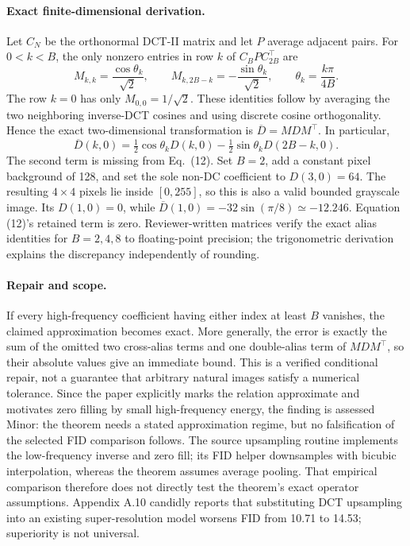 \documentclass[10pt]{article}
\begin{document}
\paragraph*{Exact finite-dimensional derivation.}\mbox{}\par
Let \(C_N\) be the orthonormal DCT-II matrix and let \(P\) average adjacent pairs. For \(0<k<B\), the only nonzero entries in row \(k\) of \(C_BP C_{2B}^{\top}\) are \[M_{k,k}=\frac{\cos\theta_k}{\sqrt2},\qquad
 M_{k,2B-k}=-\frac{\sin\theta_k}{\sqrt2},\qquad \theta_k=\frac{k\pi}{4B}.\] The row \(k=0\) has only \(M_{0,0}=1/\sqrt2\). These identities follow by averaging the two neighboring inverse-DCT cosines and using discrete cosine orthogonality. Hence the exact two-dimensional transformation is \(\overline D=MDM^{\top}\). In particular, \[\overline D(k,0)=\tfrac12\cos\theta_kD(k,0)-\tfrac12\sin\theta_kD(2B-k,0).\] The second term is missing from Eq. (12). Set \(B=2\), add a constant pixel background of 128, and set the sole non-DC coefficient to \(D(3,0)=64\). The resulting \(4\times4\) pixels lie inside \([0,255]\), so this is also a valid bounded grayscale image. Its \(D(1,0)=0\), while \(\overline D(1,0)=-32\sin(\pi/8)\simeq-12.246\). Equation (12)’s retained term is zero. Reviewer-written matrices verify the exact alias identities for \(B=2,4,8\) to floating-point precision; the trigonometric derivation explains the discrepancy independently of rounding.\par
\paragraph*{Repair and scope.}\mbox{}\par
If every high-frequency coefficient having either index at least \(B\) vanishes, the claimed approximation becomes exact. More generally, the error is exactly the sum of the omitted two cross-alias terms and one double-alias term of \(MDM^{\top}\), so their absolute values give an immediate bound. This is a verified conditional repair, not a guarantee that arbitrary natural images satisfy a numerical tolerance. Since the paper explicitly marks the relation approximate and motivates zero filling by small high-frequency energy, the finding is assessed Minor: the theorem needs a stated approximation regime, but no falsification of the selected FID comparison follows. The source upsampling routine implements the low-frequency inverse and zero fill; its FID helper downsamples with bicubic interpolation, whereas the theorem assumes average pooling. That empirical comparison therefore does not directly test the theorem’s exact operator assumptions. Appendix A.10 candidly reports that substituting DCT upsampling into an existing super-resolution model worsens FID from 10.71 to 14.53; superiority is not universal.\par
\end{document}
